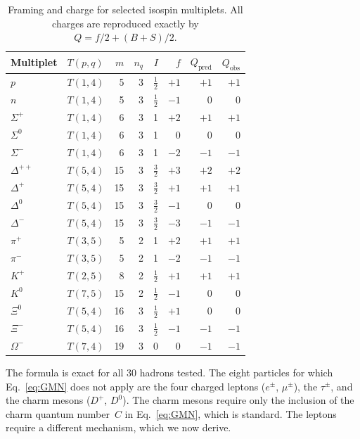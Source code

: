 \documentclass[11pt,a4paper]{article}
\begin{document}
\begin{table}[H]
\centering
\caption{Framing and charge for selected isospin multiplets.
All charges are reproduced exactly by $Q = f/2 + (B+S)/2$.}
\label{tab:charge}
\begin{tabular}{llrrrrrr}
\toprule
Multiplet & $T(p,q)$ & $m$ & $n_q$ & $I$ & $f$ & $Q_{\text{pred}}$ & $Q_{\text{obs}}$ \\
\midrule
$p$       & $T(1,4)$ & 5  & 3 & $\tfrac{1}{2}$ & $+1$ & $+1$ & $+1$ \\
$n$       & $T(1,4)$ & 5  & 3 & $\tfrac{1}{2}$ & $-1$ & $0$  & $0$  \\[4pt]
$\Sigma^+$   & $T(1,4)$ & 6  & 3 & 1    & $+2$ & $+1$ & $+1$ \\
$\Sigma^0$   & $T(1,4)$ & 6  & 3 & 1    & $0$  & $0$  & $0$  \\
$\Sigma^-$   & $T(1,4)$ & 6  & 3 & 1    & $-2$ & $-1$ & $-1$ \\[4pt]
$\Delta^{++}$ & $T(5,4)$ & 15 & 3 & $\tfrac{3}{2}$ & $+3$ & $+2$ & $+2$ \\
$\Delta^+$    & $T(5,4)$ & 15 & 3 & $\tfrac{3}{2}$ & $+1$ & $+1$ & $+1$ \\
$\Delta^0$    & $T(5,4)$ & 15 & 3 & $\tfrac{3}{2}$ & $-1$ & $0$  & $0$  \\
$\Delta^-$    & $T(5,4)$ & 15 & 3 & $\tfrac{3}{2}$ & $-3$ & $-1$ & $-1$ \\[4pt]
$\pi^+$   & $T(3,5)$ & 5  & 2 & 1    & $+2$ & $+1$ & $+1$ \\
$\pi^-$   & $T(3,5)$ & 5  & 2 & 1    & $-2$ & $-1$ & $-1$ \\[4pt]
$K^+$     & $T(2,5)$ & 8  & 2 & $\tfrac{1}{2}$ & $+1$ & $+1$ & $+1$ \\
$K^0$     & $T(7,5)$ & 15 & 2 & $\tfrac{1}{2}$ & $-1$ & $0$  & $0$  \\[4pt]
$\Xi^0$   & $T(5,4)$ & 16 & 3 & $\tfrac{1}{2}$ & $+1$ & $0$  & $0$  \\
$\Xi^-$   & $T(5,4)$ & 16 & 3 & $\tfrac{1}{2}$ & $-1$ & $-1$ & $-1$ \\[4pt]
$\Omega^-$& $T(7,4)$ & 19 & 3 & 0    & $0$  & $-1$ & $-1$ \\
\bottomrule
\end{tabular}
\end{table}

The formula is exact for all 30 hadrons tested.
The eight particles for which Eq.~\eqref{eq:GMN} does not
apply are the four charged leptons ($e^\pm$, $\mu^\pm$),
the $\tau^\pm$, and the charm mesons ($D^+$, $D^0$).
The charm mesons require only the inclusion of the charm
quantum number~$C$ in Eq.~\eqref{eq:GMN}, which is standard.
The leptons require a different mechanism, which we now derive.
\end{document}
